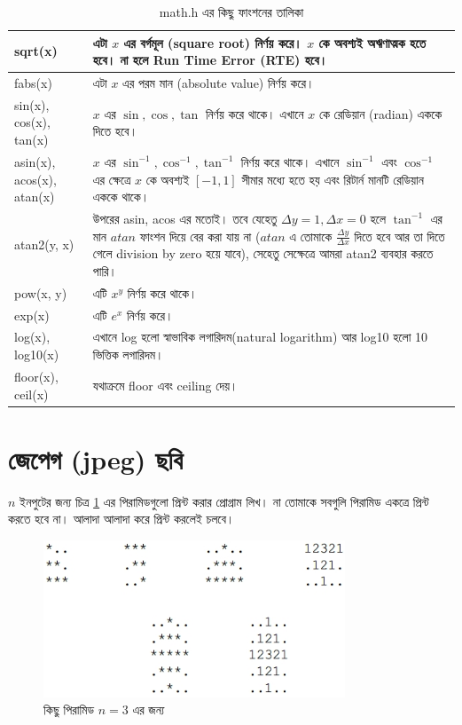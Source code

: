 \begin{table}[!hbt]
	\caption{math.h এর কিছু ফাংশনের তালিকা \label{tab:mathh}}
	\begin{center}\begin{footnotesize}
	\begin{tabular}{|l|p{8cm}|}
		\hline
		sqrt(x) & এটা $x$ এর বর্গমূল (square root) নির্ণয় করে। $x$ কে অবশ্যই অঋণাত্মক হতে হবে। না হলে Run Time Error (RTE) হবে। \\\hline
		fabs(x) & এটা $x$ এর পরম মান (absolute value) নির্ণয় করে। \\\hline
		sin(x), cos(x), tan(x) & $x$ এর $\sin, \cos, \tan$ নির্ণয় করে থাকে। এখানে $x$ কে রেডিয়ান (radian) এককে দিতে হবে। \\\hline
		asin(x), acos(x), atan(x) & $x$ এর $\sin^{-1}, \cos^{-1}, \tan^{-1}$ নির্ণয় করে থাকে। এখানে $\sin^{-1}$ এবং $\cos^{-1}$ এর ক্ষেত্রে $x$ কে অবশ্যই $[-1, 1]$ সীমার মধ্যে হতে হয় এবং রিটার্ন মানটি রেডিয়ান এককে থাকে। \\\hline
		atan2(y, x) & উপরের asin, acos এর মতোই। তবে যেহেতু $\Delta y = 1, \Delta x = 0$ হলে $\tan^{-1}$ এর মান $atan$ ফাংশন দিয়ে বের করা যায় না ($atan$ এ তোমাকে $\frac{\Delta y}{\Delta x}$ দিতে হবে আর তা দিতে গেলে division by zero হয়ে যাবে), সেহেতু সেক্ষেত্রে আমরা atan2 ব্যবহার করতে পারি।\\\hline
		pow(x, y) & এটি $x^y$ নির্ণয় করে থাকে।\\\hline
		exp(x) & এটি $e^x$ নির্ণয় করে।\\\hline
		log(x), log10(x) & এখানে log হলো স্বাভাবিক  লগারিদম(natural logarithm)   আর log10 হলো 10 ভিত্তিক লগারিদম। \\\hline
		floor(x), ceil(x) & যথাক্রমে floor এবং ceiling দেয়।\\\hline
	\end{tabular}
	\end{footnotesize}\end{center}
\end{table}


\section{জেপেগ (jpeg) ছবি}
$n$ ইনপুটের জন্য চিত্র \ref{fig:pyramid} এর পিরামিডগুলো প্রিন্ট করার প্রোগ্রাম লিখ। না তোমাকে সবগুলি পিরামিড একত্রে প্রিন্ট করতে হবে না। আলাদা আলাদা করে প্রিন্ট করলেই চলবে। 
\begin{figure}[ht!]
	\centering
	\includegraphics[width=90mm]{image/chapter_2/pyramid.jpg}
	\caption{কিছু পিরামিড $n = 3$ এর জন্য}
	\label{fig:pyramid}
\end{figure}

